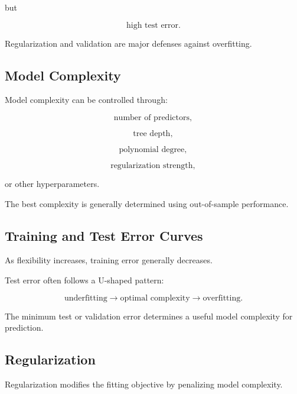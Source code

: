 but

\[
\boxed{
\text{high test error}.
}
\]

Regularization and validation are major defenses against overfitting.

\subsection{Model Complexity}
\label{subsec:model-complexity-learning}

Model complexity can be controlled through:

\[
\boxed{
\text{number of predictors},
}
\]

\[
\boxed{
\text{tree depth},
}
\]

\[
\boxed{
\text{polynomial degree},
}
\]

\[
\boxed{
\text{regularization strength},
}
\]

or other hyperparameters.

The best complexity is generally determined using out-of-sample
performance.

\subsection{Training and Test Error Curves}
\label{subsec:training-test-error-curves}

As flexibility increases, training error generally decreases.

Test error often follows a U-shaped pattern:

\[
\boxed{
\text{underfitting}
\rightarrow
\text{optimal complexity}
\rightarrow
\text{overfitting}.
}
\]

The minimum test or validation error determines a useful model complexity
for prediction.

\subsection{Regularization}
\label{subsec:regularization}

Regularization modifies the fitting objective by penalizing model
complexity.

